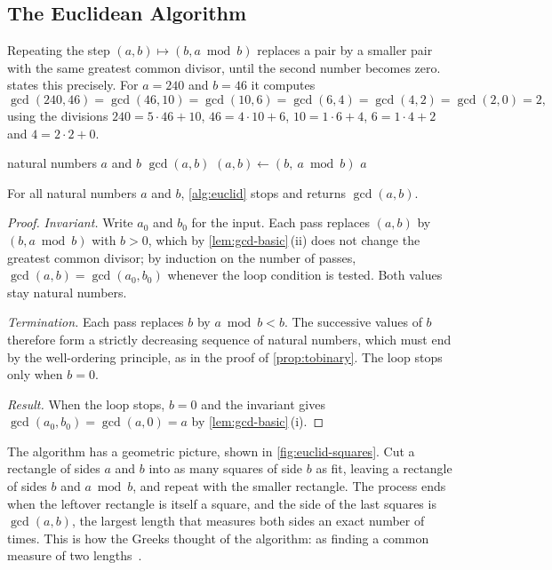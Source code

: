 \subsection{The Euclidean Algorithm}

Repeating the step $(a,b)\mapsto(b,a\bmod b)$ replaces a pair by a smaller pair with the same greatest common divisor, until the second number becomes zero.  states this precisely. For $a=240$ and $b=46$ it computes
\[
\gcd(240,46)=\gcd(46,10)=\gcd(10,6)=\gcd(6,4)=\gcd(4,2)=\gcd(2,0)=2,
\]
using the divisions $240=5\cdot46+10$, $46=4\cdot10+6$, $10=1\cdot6+4$, $6=1\cdot4+2$ and $4=2\cdot2+0$.

\begin{algorithm}
\begin{algorithmic}[1]
\Require natural numbers $a$ and $b$
\Ensure $\gcd(a,b)$
 
  \State $(a,b)\gets(b,\ a\bmod b)$
\EndWhile
\State \Return $a$
\end{algorithmic}
\caption{The Euclidean algorithm. The two assignments in line~2 happen simultaneously: both new values are computed from the old ones.}
\label{alg:euclid}
\end{algorithm}

\begin{theorem}
\label{thm:euclid-correct}
For all natural numbers $a$ and $b$, \cref{alg:euclid} stops and returns $\gcd(a,b)$.
\end{theorem}

\begin{proof}
\emph{Invariant.} Write $a_0$ and $b_0$ for the input. Each pass replaces $(a,b)$ by $(b,a\bmod b)$ with $b>0$, which by \cref{lem:gcd-basic}\,(ii) does not change the greatest common divisor; by induction on the number of passes, $\gcd(a,b)=\gcd(a_0,b_0)$ whenever the loop condition is tested. Both values stay natural numbers.

\emph{Termination.} Each pass replaces $b$ by $a\bmod b<b$. The successive values of $b$ therefore form a strictly decreasing sequence of natural numbers, which must end by the well-ordering principle, as in the proof of \cref{prop:tobinary}. The loop stops only when $b=0$.

\emph{Result.} When the loop stops, $b=0$ and the invariant gives $\gcd(a_0,b_0)=\gcd(a,0)=a$ by \cref{lem:gcd-basic}\,(i).
\end{proof}

The algorithm has a geometric picture, shown in \cref{fig:euclid-squares}. Cut a rectangle of sides $a$ and $b$ into as many squares of side $b$ as fit, leaving a rectangle of sides $b$ and $a\bmod b$, and repeat with the smaller rectangle. The process ends when the leftover rectangle is itself a square, and the side of the last squares is $\gcd(a,b)$, the largest length that measures both sides an exact number of times. This is how the Greeks thought of the algorithm: as finding a common measure of two lengths~\cite{heath1956euclid}.

